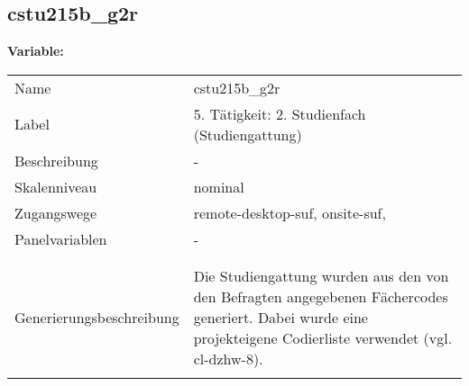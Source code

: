 	
	
	\subsection{cstu215b\_g2r}
	\label{subSection:cstu215b_g2r}

	\noindent\textbf{Variable:}\\
		\begin{tabular}{lL{11.3cm}}
			\label{tableVariable:cstu215b_g2r}
			Name & cstu215b\_g2r \\
			Label & 5. Tätigkeit: 2. Studienfach (Studiengattung) \\
			Beschreibung & - \\
			Skalenniveau & nominal \\
			Zugangswege &
				remote-desktop-suf,
				onsite-suf,
 \\
			Panelvariablen & -
			 \\
			 \\
 \\
					Generierungsbeschreibung & Die Studiengattung wurden aus den von den Befragten angegebenen Fächercodes generiert.  Dabei wurde eine projekteigene Codierliste verwendet (vgl. cl-dzhw-8).
				 \\	
			 \\
		\end{tabular}






